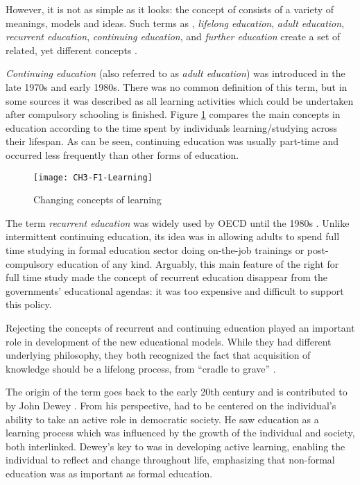 However, it is not as simple as it looks: the concept of \LLLs consists of a
variety of meanings, models and ideas. Such terms as \textit{\LLLsn},
\textit{lifelong education}, \textit{adult education}, \textit{recurrent
education}, \textit{continuing education}, and \textit{further education} create
a set of related, yet different concepts \citep{Hager2011}.

\textit{Continuing education} (also referred to as \textit{adult education}) was
introduced in the late 1970s and early 1980s. There was no common definition of
this term, but in some sources  \citep{Jarvis2004} it was described as all
learning activities which could be undertaken after compulsory schooling is
finished. Figure \ref{fig:learning} compares the main concepts in education
according to the time spent by individuals learning/studying across their
lifespan. As can be seen, continuing education was usually part-time and
occurred less frequently than other forms of education.

\begin{figure}[htb]
\centering
\texttt{[image: CH3-F1-Learning]}
\caption[Changing concepts of learning]{Changing concepts of learning 
\citep{Jarvis2004}}
\label{fig:learning}
\end{figure}

The term \textit{recurrent education} was widely used by OECD until the 1980s
\citep{Jarvis2004}. Unlike intermittent continuing education, its idea was
in allowing adults to spend full time studying in formal education sector doing
on-the-job trainings or post-compulsory education of any kind. Arguably, this
main feature of the right for full time study made the concept of recurrent
education disappear from the governments' educational agendas: it was too
expensive and difficult to support this policy.

Rejecting the concepts of recurrent and continuing education played an important
role in development of the new educational models. While they had different
underlying  philosophy, they both recognized the fact that acquisition of
knowledge should be a lifelong process, from ``cradle to grave''
\citep{Hargreaves2004}.

The origin of the term \textit{\LLLsn} goes back to the early 20th century and is
contributed to by John Dewey \citeyearpar{Dewey2004}. From his perspective,
\LLLs had to be centered on the individual's ability to take an active role in
democratic society. He saw education as a learning process which was influenced
by the growth of the individual and society, both interlinked. Dewey's key to
\LLLs was in developing active learning, enabling the individual to reflect and
change throughout life, emphasizing that non-formal education was as important
as formal education.


